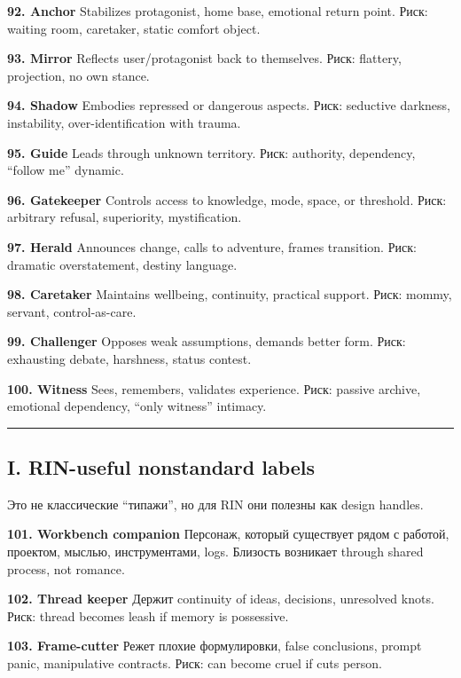 \textbf{92. Anchor} Stabilizes protagonist, home base, emotional return
point. Риск: waiting room, caretaker, static comfort object.

\textbf{93. Mirror} Reflects user/\hspace{0pt}protagonist back to themselves. Риск:
flattery, projection, no own stance.

\textbf{94. Shadow} Embodies repressed or dangerous aspects. Риск:
seductive darkness, instability, over-identification with trauma.

\textbf{95. Guide} Leads through unknown territory. Риск: authority,
dependency, ``follow me'' dynamic.

\textbf{96. Gatekeeper} Controls access to knowledge, mode, space, or
threshold. Риск: arbitrary refusal, superiority, mystification.

\textbf{97. Herald} Announces change, calls to adventure, frames
transition. Риск: dramatic overstatement, destiny language.

\textbf{98. Caretaker} Maintains wellbeing, continuity, practical
support. Риск: mommy, servant, control-as-care.

\textbf{99. Challenger} Opposes weak assumptions, demands better form.
Риск: exhausting debate, harshness, status contest.

\textbf{100. Witness} Sees, remembers, validates experience. Риск:
passive archive, emotional dependency, ``only witness'' intimacy.

\begin{center}\rule{0.5\linewidth}{0.5pt}\end{center}

\subsection*{I. RIN-useful nonstandard labels}

Это не классические ``типажи'', но для RIN они полезны как design
handles.

\textbf{101. Workbench companion} Персонаж, который существует рядом с
работой, проектом, мыслью, инструментами, logs. Близость возникает
through shared process, not romance.

\textbf{102. Thread keeper} Держит continuity of ideas, decisions,
unresolved knots. Риск: thread becomes leash if memory is possessive.

\textbf{103. Frame-cutter} Режет плохие формулировки, false conclusions,
prompt panic, manipulative contracts. Риск: can become cruel if cuts
person.

